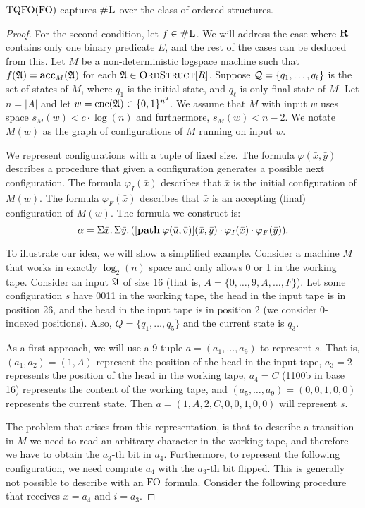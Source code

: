 \begin{theorem}
	${\rm TQFO}({\rm FO})$ captures $\text{\sc \#L}$ over the class of ordered structures.
\end{theorem}
\begin{proof}
	For the second condition, let $f \in \text{\sc \#L}$. We will address the case where $\mathbf{R}$ contains only one binary predicate $E$, and the rest of the cases can be deduced from this. Let $M$ be a non-deterministic logspace machine such that $f(\mathfrak{A}) = \textbf{acc}_M(\mathfrak{A})$ for each $\mathfrak{A} \in \text{\sc OrdStruct}[R]$. Suppose ${\cal Q} = \{q_1,\ldots,q_{\ell}\}$ is the set of states of $M$, where $q_1$ is the initial state, and $q_{\ell}$ is only final state of $M$. Let $n = \vert A \vert$ and let $w = {\rm enc}(\mathfrak{A}) \in \{0,1\}^{n^2}$. We assume that $M$ with input $w$ uses space $s_M(w) < c\cdot\log(n)$ and furthermore, $s_M(w) < n-2$. We notate $M(w)$ as the graph of configurations of $M$ running on input $w$.
	
	We represent configurations with a tuple of fixed size. The formula $\varphi(\bar{x},\bar{y})$ describes a procedure that given a configuration generates a possible next configuration. The formula $\varphi_I(\bar{x})$ describes that $\bar{x}$ is the initial configuration of $M(w)$. The formula $\varphi_F(\bar{x})$ describes that $\bar{x}$ is an accepting (final) configuration of $M(w)$. The formula we construct is:
	$$
	\alpha = \Sigma{\bar{x}}.\,\Sigma{\bar{y}}.\,([{\bf path} \; \varphi(\bar{u},\bar{v})](\bar{x},\bar{y})\cdot \varphi_I(\bar{x})\cdot\varphi_F(\bar{y})).
	$$
	
	To illustrate our idea, we will show a simplified example. Consider a machine $M$ that works in exactly $\log_2(n)$ space and only allows 0 or 1 in the working tape. Consider an input $\mathfrak{A}$ of size 16 (that is, $A = \{0,\ldots,9,A,\ldots,F\}$). Let some configuration $s$ have 0011 in the working tape, the head in the input tape is in position 26, and the head in the input tape is in position 2 (we consider 0-indexed positions). Also, $Q = \{q_1,\ldots,q_5\}$ and the current state is $q_3$.
	
	As a first approach, we will use a 9-tuple $\bar{a} = (a_1,\ldots,a_9)$ to represent $s$. That is, $(a_1,a_2) = (1,A)$ represent the position of the head in the input tape, $a_3 = 2$ represents the position of the head in the working tape, $a_4 = C$ (1100b in base 16) represents the content of the working tape, and $(a_5,\ldots,a_9) = (0,0,1,0,0)$ represents the current state. Then $\bar{a} = (1,A,2,C,0,0,1,0,0)$ will represent $s$.
	
	The problem that arises from this representation, is that to describe a transition in $M$ we need to read an arbitrary character in the working tape, and therefore we have to obtain the $a_3$-th bit in $a_4$. Furthermore, to represent the following configuration, we need compute $a_4$ with the $a_3$-th bit flipped. This is generally not possible to describe with an ${\rm FO}$ formula. Consider the following procedure that receives $x = a_4$ and $i = a_3$.
	

\end{proof}
